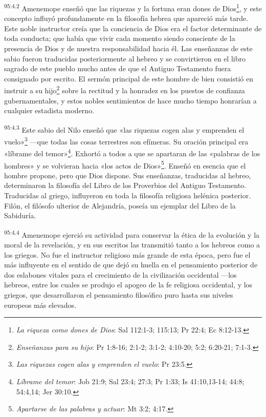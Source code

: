 \par
\textsuperscript{95:4.2} Amenemope enseñó que las riquezas y la fortuna eran dones de Dios\footnote{\textit{La riqueza como dones de Dios}: Sal 112:1-3; 115:13; Pr 22:4; Ec 8:12-13.}, y este concepto influyó profundamente en la filosofía hebrea que apareció más tarde. Este noble instructor creía que la conciencia de Dios era el factor determinante de toda conducta; que había que vivir cada momento siendo consciente de la presencia de Dios y de nuestra responsabilidad hacia él. Las enseñanzas de este sabio fueron traducidas posteriormente al hebreo y se convirtieron en el libro sagrado de este pueblo mucho antes de que el Antiguo Testamento fuera consignado por escrito. El sermón principal de este hombre de bien consistió en instruir a su hijo\footnote{\textit{Enseñanzas para su hijo}: Pr 1:8-16; 2:1-2; 3:1-2; 4:10-20; 5:2; 6:20-21; 7:1-3.} sobre la rectitud y la honradez en los puestos de confianza gubernamentales, y estos nobles sentimientos de hace mucho tiempo honrarían a cualquier estadista moderno.

\par
\textsuperscript{95:4.3} Este sabio del Nilo enseñó que «las riquezas cogen alas y emprenden el vuelo»\footnote{\textit{Las riquezas cogen alas y emprenden el vuelo}: Pr 23:5.} ---que todas las cosas terrestres son efímeras. Su oración principal era «líbrame del temor»\footnote{\textit{Líbrame del temor}: Job 21:9; Sal 23:4; 27:3; Pr 1:33; Is 41:10,13-14; 44:8; 54:4,14; Jer 30:10.}. Exhortó a todos a que se apartaran de las «palabras de los hombres» y se volvieran hacia «los actos de Dios»\footnote{\textit{Apartarse de las palabras y actuar}: Mt 3:2; 4:17.}. Enseñó en esencia que el hombre propone, pero que Dios dispone. Sus enseñanzas, traducidas al hebreo, determinaron la filosofía del Libro de los Proverbios del Antiguo Testamento. Traducidas al griego, influyeron en toda la filosofía religiosa helénica posterior. Filón, el filósofo ulterior de Alejandría, poseía un ejemplar del Libro de la Sabiduría.

\par
\textsuperscript{95:4.4} Amenemope ejerció su actividad para conservar la ética de la evolución y la moral de la revelación, y en sus escritos las transmitió tanto a los hebreos como a los griegos. No fue el instructor religioso más grande de esta época, pero fue el más influyente en el sentido de que dejó su huella en el pensamiento posterior de dos eslabones vitales para el crecimiento de la civilización occidental ---los hebreos, entre los cuales se produjo el apogeo de la fe religiosa occidental, y los griegos, que desarrollaron el pensamiento filosófico puro hasta sus niveles europeos más elevados.

